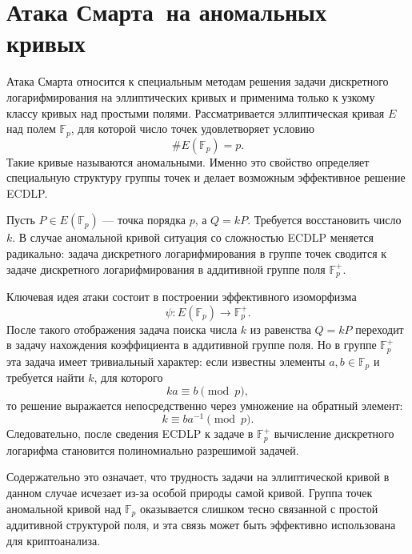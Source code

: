 \section[Атака Смарта]{Атака Смарта\ на аномальных кривых}

Атака Смарта относится к специальным методам решения задачи дискретного логарифмирования на эллиптических кривых и применима только к узкому классу кривых над простыми полями. Рассматривается эллиптическая кривая $E$ над полем $\mathbb{F}_p$, для которой число точек удовлетворяет условию
\[
\#E(\mathbb{F}_p)=p.
\]
Такие кривые называются аномальными. Именно это свойство определяет специальную структуру группы точек и делает возможным эффективное решение ECDLP.

Пусть $P\in E(\mathbb{F}_p)$ --- точка порядка $p$, а $Q=kP$. Требуется восстановить число $k$. В случае аномальной кривой ситуация со сложностью ECDLP меняется радикально: задача дискретного логарифмирования в группе точек сводится к задаче дискретного логарифмирования в аддитивной группе поля $\mathbb{F}_p^+$.

Ключевая идея атаки состоит в построении эффективного изоморфизма
\[
\psi:E(\mathbb{F}_p)\to \mathbb{F}_p^+.
\]
После такого отображения задача поиска числа $k$ из равенства $Q=kP$ переходит в задачу нахождения коэффициента в аддитивной группе поля. Но в группе $\mathbb{F}_p^+$ эта задача имеет тривиальный характер: если известны элементы $a,b\in \mathbb{F}_p$ и требуется найти $k$, для которого
\[
ka\equiv b \pmod p,
\]
то решение выражается непосредственно через умножение на обратный элемент:
\[
k\equiv ba^{-1}\pmod p.
\]
Следовательно, после сведения ECDLP к задаче в $\mathbb{F}_p^+$ вычисление дискретного логарифма становится полиномиально разрешимой задачей.

Содержательно это означает, что трудность задачи на эллиптической кривой в данном случае исчезает из-за особой природы самой кривой. Группа точек аномальной кривой над $\mathbb{F}_p$ оказывается слишком тесно связанной с простой аддитивной структурой поля, и эта связь может быть эффективно использована для криптоанализа.